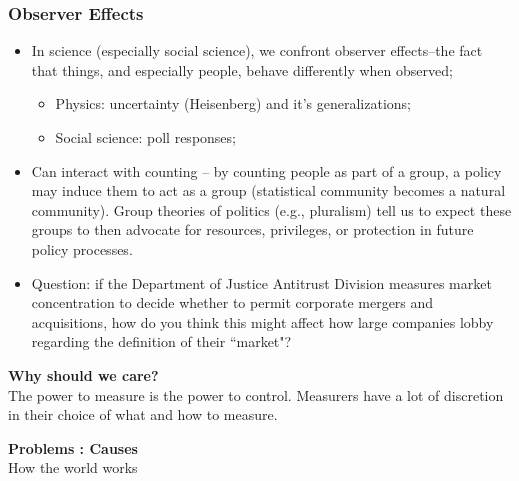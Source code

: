 \documentclass[aspectratio=169]{beamer}
\theoremstyle{principle}
\begin{document}
\begin{frame}
\frametitle{Observer Effects}
\begin{itemize}
\item In science (especially social science), we confront observer effects–the fact that things, and especially people, behave differently when observed;
\begin{itemize}
\item Physics: uncertainty (Heisenberg) and it's generalizations;
\item Social science: poll responses;
\end{itemize}
\bigskip
\item Can interact with counting -- by counting people as part of a group, a policy may induce them to act as a group (statistical community becomes a natural community). Group theories of politics (e.g., pluralism) tell us to expect these groups to then advocate for resources, privileges, or protection in future policy processes.
\bigskip
\item Question: if the Department of Justice Antitrust Division measures market concentration to decide whether to permit corporate mergers and acquisitions, how do you think this might affect how large companies lobby regarding the definition of their ``market"?
\end{itemize}
\end{frame}

\begin{frame}

\begin{center}
\Huge\textbf{Why should we care?}\\
\bigskip
\bigskip
\large The power to measure is the power to control.  Measurers have a lot of discretion in their choice of what and how to measure.\\
\end{center}

\end{frame}

\begin{frame}

\begin{center}
\Huge\textbf{Problems : Causes}\\
\bigskip
\bigskip
\large How the world works
\end{center}

\end{frame}
\end{document}

